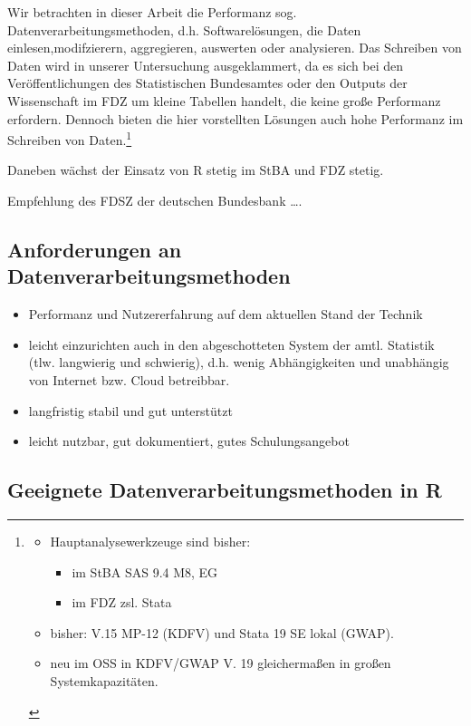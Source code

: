\documentclass[
  german,
  10pt,
  twoside]{article}
\providecommand{\tightlist}{%
  \setlength{\itemsep}{0pt}\setlength{\parskip}{0pt}}
\begin{document}
Wir betrachten in dieser Arbeit die Performanz sog.
Datenverarbeitungsmethoden, d.h. Softwarelösungen, die Daten
einlesen,modifzierern, aggregieren, auswerten oder analysieren. Das
Schreiben von Daten wird in unserer Untersuchung ausgeklammert, da es
sich bei den Veröffentlichungen des Statistischen Bundesamtes oder den
Outputs der Wissenschaft im FDZ um kleine Tabellen handelt, die keine
große Performanz erfordern. Dennoch bieten die hier vorstellten Lösungen
auch hohe Performanz im Schreiben von Daten.\footnote{\begin{itemize}
  \tightlist
  \item
    Hauptanalysewerkzeuge sind bisher:

    \begin{itemize}
    \tightlist
    \item
      im StBA SAS 9.4 M8, EG
    \item
      im FDZ zsl. Stata
    \end{itemize}
  \item
    bisher: V.15 MP-12 (KDFV) und Stata 19 SE lokal (GWAP).
  \item
    neu im OSS in KDFV/GWAP V. 19 gleichermaßen in großen
    Systemkapazitäten.
  \end{itemize}}

Daneben wächst der Einsatz von R stetig im StBA und FDZ stetig.

Empfehlung des FDSZ der deutschen Bundesbank
\textcite{gomolka2021largedata} \ldots.

\subsection{Anforderungen an
Datenverarbeitungsmethoden}\label{anforderungen-an-datenverarbeitungsmethoden}

\begin{itemize}
\tightlist
\item
  Performanz und Nutzererfahrung auf dem aktuellen Stand der Technik
\item
  leicht einzurichten auch in den abgeschotteten System der amtl.
  Statistik (tlw. langwierig und schwierig), d.h. wenig Abhängigkeiten
  und unabhängig von Internet bzw. Cloud betreibbar.
\item
  langfristig stabil und gut unterstützt
\item
  leicht nutzbar, gut dokumentiert, gutes Schulungsangebot
\end{itemize}

\subsection{Geeignete Datenverarbeitungsmethoden in
R}\label{geeignete-datenverarbeitungsmethoden-in-r}
\end{document}
